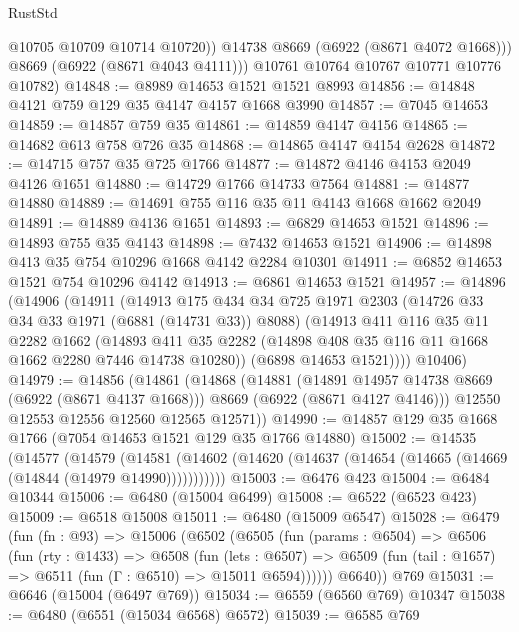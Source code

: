 \begin{lexlean}{RustStd}
\begin{coremodule}
              @10705
              @10709
              @10714
              @10720))
          @14738
          @8669
          (@6922 (@8671 @4072 @1668)))
        @8669
        (@6922 (@8671 @4043 @4111)))
      @10761
      @10764
      @10767
      @10771
      @10776
      @10782)
@14848 := @8989 @14653 @1521 @1521 @8993
@14856 := @14848 @4121 @759 @129 @35 @4147 @4157 @1668 @3990
@14857 := @7045 @14653
@14859 := @14857 @759 @35
@14861 := @14859 @4147 @4156
@14865 := @14682 @613 @758 @726 @35
@14868 := @14865 @4147 @4154 @2628
@14872 := @14715 @757 @35 @725 @1766
@14877 := @14872 @4146 @4153 @2049 @4126 @1651
@14880 := @14729 @1766 @14733 @7564
@14881 := @14877 @14880
@14889 := @14691 @755 @116 @35 @11 @4143 @1668 @1662 @2049
@14891 := @14889 @4136 @1651
@14893 := @6829 @14653 @1521
@14896 := @14893 @755 @35 @4143
@14898 := @7432 @14653 @1521
@14906 := @14898 @413 @35 @754 @10296 @1668 @4142 @2284 @10301
@14911 := @6852 @14653 @1521 @754 @10296 @4142
@14913 := @6861 @14653 @1521
@14957 := @14896
    (@14906
      (@14911
        (@14913
          @175
          @434
          @34
          @725
          @1971
          @2303
          (@14726 @33 @34 @33 @1971 (@6881 (@14731 @33)) @8088)
          (@14913
            @411
            @116
            @35
            @11
            @2282
            @1662
            (@14893 @411 @35 @2282 (@14898 @408 @35 @116 @11 @1668 @1662 @2280 @7446 @14738 @10280))
            (@6898 @14653 @1521))))
      @10406)
@14979 := @14856
    (@14861
      (@14868
        (@14881
          (@14891 @14957 @14738 @8669 (@6922 (@8671 @4137 @1668)))
          @8669
          (@6922 (@8671 @4127 @4146)))
        @12550
        @12553
        @12556
        @12560
        @12565
        @12571))
@14990 := @14857 @129 @35 @1668 @1766 (@7054 @14653 @1521 @129 @35 @1766 @14880)
@15002 := @14535
    (@14577
      (@14579
        (@14581 (@14602 (@14620 (@14637 (@14654 (@14665 (@14669 (@14844 (@14979 @14990)))))))))))
@15003 := @6476 @423
@15004 := @6484 @10344
@15006 := @6480 (@15004 @6499)
@15008 := @6522 (@6523 @423)
@15009 := @6518 @15008
@15011 := @6480 (@15009 @6547)
@15028 := @6479
    (fun (fn : @93) =>
    @15006
      (@6502
        (@6505
          (fun (params : @6504) =>
          @6506
            (fun (rty : @1433) =>
            @6508
              (fun (lets : @6507) =>
              @6509 (fun (tail : @1657) => @6511 (fun (Γ : @6510) => @15011 @6594))))))
        @6640))
    @769
@15031 := @6646 (@15004 (@6497 @769))
@15034 := @6559 (@6560 @769) @10347
@15038 := @6480 (@6551 (@15034 @6568) @6572)
@15039 := @6585 @769

\end{coremodule}
\end{lexlean}
